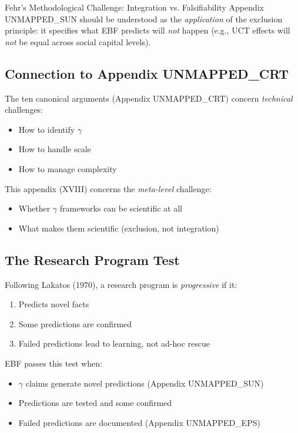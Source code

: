 \begin{chapter}{Fehr's Methodological Challenge: Integration vs. Falsifiability}
Appendix UNMAPPED_SUN should be understood as the \textit{application} of the exclusion principle: it specifies what EBF predicts will \textit{not} happen (e.g., UCT effects will \textit{not} be equal across social capital levels).

\subsection{Connection to Appendix UNMAPPED_CRT}

The ten canonical arguments (Appendix UNMAPPED_CRT) concern \textit{technical} challenges:
\begin{itemize}[noitemsep]
    \item How to identify $\gamma$
    \item How to handle scale
    \item How to manage complexity
\end{itemize}

This appendix (XVIII) concerns the \textit{meta-level} challenge:
\begin{itemize}[noitemsep]
    \item Whether $\gamma$ frameworks can be scientific at all
    \item What makes them scientific (exclusion, not integration)
\end{itemize}

\subsection{The Research Program Test}

Following Lakatos (1970), a research program is \textit{progressive} if it:
\begin{enumerate}
    \item Predicts novel facts
    \item Some predictions are confirmed
    \item Failed predictions lead to learning, not ad-hoc rescue
\end{enumerate}

EBF passes this test when:
\begin{itemize}[noitemsep]
    \item $\gamma$ claims generate novel predictions (Appendix UNMAPPED_SUN)
    \item Predictions are tested and some confirmed
    \item Failed predictions are documented (Appendix UNMAPPED_EPS)
\end{itemize}


\end{chapter}
